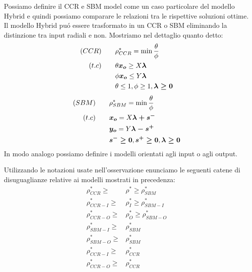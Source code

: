 \begin{oss}
Possiamo definire il CCR e SBM model come un caso particolare del modello Hybrid e quindi possiamo comparare le relazioni tra le rispettive soluzioni ottime. Il modello Hybrid pu\'o essere trasformato in un CCR o SBM eliminando la distinzione tra input radiali e non. Mostriamo nel dettaglio quanto detto:
\begin{equation}
\begin{split}
\text(CCR) \qquad & \rho^*_{CCR} = \min \frac{\theta}{\phi} \\
\text(t.c) \qquad & \theta \boldsymbol{x_o} \geq X\boldsymbol{\lambda} \\
& \phi \boldsymbol{x_o} \leq Y \boldsymbol{\lambda} \\
& \theta \leq 1, \phi \geq 1, \boldsymbol{\lambda \geq 0}\\
\end{split}
\end{equation}
\begin{equation}
\begin{split}
\text(SBM) \qquad & \rho^*_{SBM} = \min \frac{\theta}{\phi} \\
\text(t.c) \qquad & \boldsymbol{x_o} = X\boldsymbol{\lambda + s^-} \\
& \boldsymbol{y_o} = Y\boldsymbol{\lambda - s^+} \\
& \boldsymbol{s^- \geq 0}, \boldsymbol{s^+ \geq 0}, \boldsymbol{\lambda \geq 0}\\
\end{split}
\end{equation}
In modo analogo possiamo definire i modelli orientati agli input o agli output.
\end{oss}
\begin{teor}
 Utilizzando le notazioni usate nell'osservazione enunciamo le seguenti catene di disuguaglianze relative ai modelli mostrati in precedenza:
\begin{equation}
\begin{split}
\rho^*_{CCR}   \geq & \rho^* \geq \rho^*_{SBM} \\
\rho^*_{CCR-I} \geq & \rho^*_I \geq \rho^*_{SBM-I} \\
\rho^*_{CCR-O} \geq & \rho^*_O \geq \rho^*_{SBM-O} \\
\rho^*_{SBM-I} \geq & \rho^*_{SBM} \\
\rho^*_{SBM-O} \geq & \rho^*_{SBM} \\
\rho^*_{CCR-I} \geq & \rho^*_{CCR} \\
\rho^*_{CCR-O} \geq & \rho^*_{CCR} \\
\end{split}
\end{equation}
\end{teor}